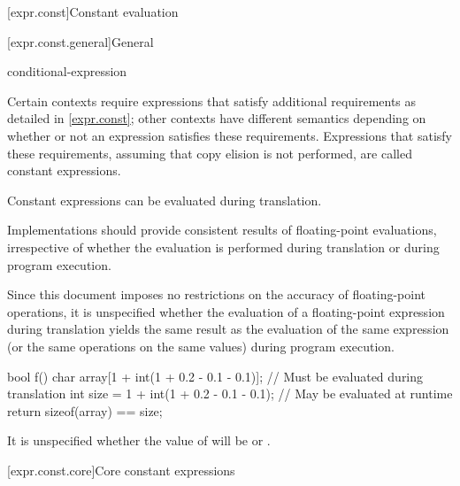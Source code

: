 [expr.const]{Constant evaluation}%

[expr.const.general]{General}

\begin{bnf}
\br
    conditional-expression
\end{bnf}

\pnum
Certain contexts require expressions that satisfy additional
requirements as detailed in \ref{expr.const}; other contexts have different
semantics depending on whether or not an expression satisfies these requirements.
Expressions that satisfy these requirements,
assuming that copy elision is not performed,
are called constant expressions.
\begin{note}
Constant expressions can be evaluated
during translation.
\end{note}

\pnum
\recommended
Implementations should provide consistent results of floating-point evaluations,
irrespective of whether the evaluation is performed
during translation or during program execution.
\begin{note}
Since this document
imposes no restrictions on the accuracy of floating-point operations, it is unspecified whether the
evaluation of a floating-point expression during translation yields the same result as the
evaluation of the same expression (or the same operations on the same values) during program
execution.
\begin{example}
\begin{codeblock}
bool f() {
    char array[1 + int(1 + 0.2 - 0.1 - 0.1)];   // Must be evaluated during translation
    int size = 1 + int(1 + 0.2 - 0.1 - 0.1);    // May be evaluated at runtime
    return sizeof(array) == size;
}
\end{codeblock}
It is unspecified whether the value of  will be  or .
\end{example}
\end{note}

[expr.const.core]{Core constant expressions}

